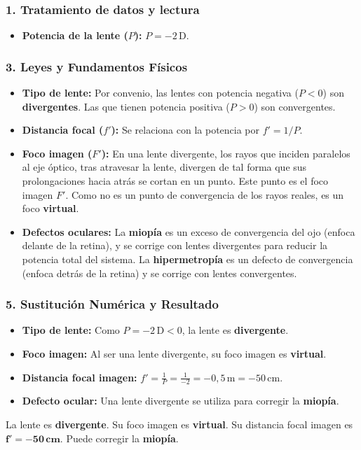 \subsubsection*{1. Tratamiento de datos y lectura}
\begin{itemize}
    \item \textbf{Potencia de la lente ($P$):} $P = -2\,\text{D}$.
\end{itemize}
\subsubsection*{3. Leyes y Fundamentos Físicos}
\begin{itemize}
    \item \textbf{Tipo de lente:} Por convenio, las lentes con potencia negativa ($P<0$) son \textbf{divergentes}. Las que tienen potencia positiva ($P>0$) son convergentes.
    \item \textbf{Distancia focal ($f'$):} Se relaciona con la potencia por $f' = 1/P$.
    \item \textbf{Foco imagen ($F'$):} En una lente divergente, los rayos que inciden paralelos al eje óptico, tras atravesar la lente, divergen de tal forma que sus prolongaciones hacia atrás se cortan en un punto. Este punto es el foco imagen $F'$. Como no es un punto de convergencia de los rayos reales, es un foco \textbf{virtual}.
    \item \textbf{Defectos oculares:} La \textbf{miopía} es un exceso de convergencia del ojo (enfoca delante de la retina), y se corrige con lentes divergentes para reducir la potencia total del sistema. La \textbf{hipermetropía} es un defecto de convergencia (enfoca detrás de la retina) y se corrige con lentes convergentes.
\end{itemize}
\subsubsection*{5. Sustitución Numérica y Resultado}
\begin{itemize}
    \item \textbf{Tipo de lente:} Como $P=-2\,\text{D} < 0$, la lente es \textbf{divergente}.
    \item \textbf{Foco imagen:} Al ser una lente divergente, su foco imagen es \textbf{virtual}.
    \item \textbf{Distancia focal imagen:} $f' = \frac{1}{P} = \frac{1}{-2} = -0,5\,\text{m} = -50\,\text{cm}$.
    \item \textbf{Defecto ocular:} Una lente divergente se utiliza para corregir la \textbf{miopía}.
\end{itemize}
\begin{cajaresultado}
La lente es \textbf{divergente}. Su foco imagen es \textbf{virtual}. Su distancia focal imagen es $\boldsymbol{f' = -50\,\textbf{cm}}$. Puede corregir la \textbf{miopía}.
\end{cajaresultado}
